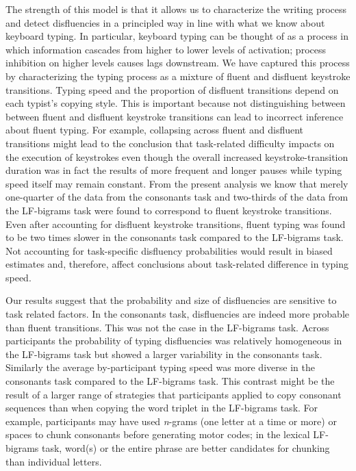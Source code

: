\documentclass[
  english,
  man,mask,floatsintext]{apa7}
\begin{document}
The strength of this model is that it allows us to characterize the writing process and detect disfluencies in a principled way in line with what we know about keyboard typing. In particular, keyboard typing can be thought of as a process in which information cascades from higher to lower levels of activation; process inhibition on higher levels causes lags downstream. We have captured this process by characterizing the typing process as a mixture of fluent and disfluent keystroke transitions. Typing speed and the proportion of disfluent transitions depend on each typist's copying style. This is important because not distinguishing between between fluent and disfluent keystroke transitions can lead to incorrect inference about fluent typing. For example, collapsing across fluent and disfluent transitions might lead to the conclusion that task-related difficulty impacts on the execution of keystrokes even though the overall increased keystroke-transition duration was in fact the results of more frequent and longer pauses while typing speed itself may remain constant. From the present analysis we know that merely one-quarter of the data from the consonants task and two-thirds of the data from the LF-bigrams task were found to correspond to fluent keystroke transitions. Even after accounting for disfluent keystroke transitions, fluent typing was found to be two times slower in the consonants task compared to the LF-bigrams task. Not accounting for task-specific disfluency probabilities would result in biased estimates and, therefore, affect conclusions about task-related difference in typing speed.

Our results suggest that the probability and size of disfluencies are sensitive to task related factors. In the consonants task, disfluencies are indeed more probable than fluent transitions. This was not the case in the LF-bigrams task. Across participants the probability of typing disfluencies was relatively homogeneous in the LF-bigrams task but showed a larger variability in the consonants task. Similarly the average by-participant typing speed was more diverse in the consonants task compared to the LF-bigrams task. This contrast might be the result of a larger range of strategies that participants applied to copy consonant sequences than when copying the word triplet in the LF-bigrams task. For example, participants may have used \emph{n}-grams (one letter at a time or more) or spaces to chunk consonants before generating motor codes; in the lexical LF-bigrams task, word(s) or the entire phrase are better candidates for chunking than individual letters.
\end{document}
